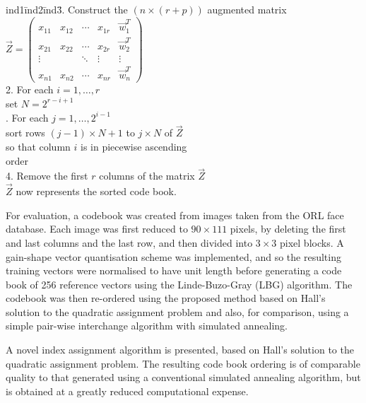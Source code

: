 \documentclass[a4paper]{report}
\begin{document}
\begin{tabbing}
ind1\= ind2\= ind3\= .  Construct the $(n\times (r+p))$ augmented matrix\\[10pt]
\> \begin{math}
\vec{Z} =
\left(
\begin{array}{ccccc}
x_{11} & x_{12} & \cdots & x_{1r} & \vec{w}_1^T\\
x_{21} & x_{22} & \cdots & x_{2r} & \vec{w}_2^T\\
\vdots & & \ddots & \vdots & \vdots\\
x_{n1} & x_{n2} & \cdots & x_{nr} & \vec{w}_n^T
\end{array}
\right)
\end{math}\\[10pt]
2. For each $i=1,\ldots, r$\\
\> set $N=2^{r-i+1}$\\
. For each $j=1, \ldots, 2^{i-1}$\\
\>\> sort rows $(j-1)\times N+1$ to $j\times N$ of $\vec{Z}$\\
\>\> so that column $i$ is in piecewise ascending\\
\>\> order\\
4. Remove the first $r$ columns of the matrix $\vec{Z}$\\[10pt]
$\vec{Z}$ now represents the sorted code book.
\end{tabbing}


For evaluation, a codebook was created from images taken from the ORL face
database.  Each image was first reduced to $90 \times 111$ pixels,
by deleting the first and last columns and the last row, and then divided into
$3 \times 3$ pixel blocks.  A gain-shape vector quantisation scheme was
implemented, and so the resulting training vectors were normalised to have unit
length before generating a code book of 256 reference vectors using the
Linde-Buzo-Gray (LBG) algorithm.  The codebook was then
re-ordered using the proposed method based on Hall's solution to the quadratic
assignment problem and also, for comparison, using a simple pair-wise
interchange algorithm with simulated annealing.


A novel index assignment algorithm is presented, based on Hall's solution to the
quadratic assignment problem.  The resulting code book ordering is of comparable
quality to that generated using a conventional simulated annealing algorithm,
but is obtained at a greatly reduced computational expense.
\end{document}
